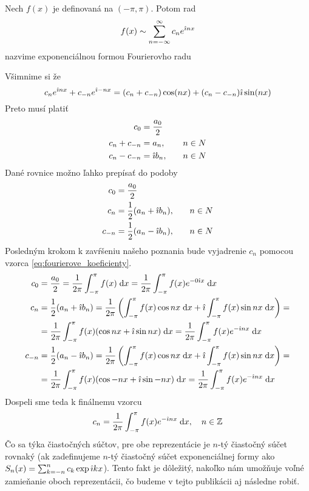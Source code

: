 \begin{definicia}
    Nech $f(x)$ je definovaná na $(-\pi,\pi)$. Potom rad
    \begin{equation}
        f(x) \sim \sum_{n=-\infty}^{\infty} c_n e^{\hat{\imath} n x}
    \end{equation}
    nazvime exponenciálnou formou Fourierovho radu
\end{definicia}
Všimnime si že
\begin{equation}
    c_n e^{\hat{\imath} n x} + c_{-n} e^{\hat{\imath} -n x} =
     (c_n +c_{-n}) \cos(nx) + (c_n - c_{-n}) \hat{\imath} \sin(nx)
\end{equation}
Preto musí platiť
\begin{align}
    c_0 &= \frac{a_0}{2} \\
    c_n + c_{-n} &= a_n, \quad & n \in N \\
    c_n - c_{-n} &= \hat{\imath} b_n, \quad & n \in N
    \label{eq:koeficienty_to_trie}
\end{align}
Dané rovnice možno ľahko prepísať do podoby
\begin{align}
    c_0 &= \frac{a_0}{2} \\
    c_n &= \frac{1}{2}(a_n + \hat{\imath} b_n), \quad & n \in N \\
    c_{-n} &=\frac{1}{2}(a_n - \hat{\imath} b_n), \quad & n \in N
    \label{eq:koeficienty_to_exp}
\end{align}
Posledným krokom k zavŕšeniu našeho poznania bude vyjadrenie $c_n$
pomocou vzorca \ref{eq:fourierove_koeficienty}.
\begin{align}
    c_0 &= \frac{a_0}{2} = \frac{1}{2\pi} \int_{-\pi}^{\pi} f(x) \; \mathrm{d} x = 
            \frac{1}{2\pi} \int_{-\pi}^{\pi} f(x) e^{-0 \hat{\imath} x} \; \mathrm{d} x \\
    c_n &= \frac{1}{2}(a_n + \hat{\imath} b_n) =
          \frac{1}{2\pi}\left(
            \int_{-\pi}^{\pi} f(x) \cos nx \; \mathrm{d} x + 
            \hat{\imath} \int_{-\pi}^{\pi} f(x) \sin nx \; \mathrm{d} x  
            \right) = \\
         &=\frac{1}{2\pi} \int_{-\pi}^{\pi} f(x) (\cos nx + \hat{\imath} \sin nx) \; \mathrm{d} x =
          \frac{1}{2\pi} \int_{-\pi}^{\pi} f(x) e^{- \hat{\imath} n x} \; \mathrm{d} x \\
    c_{-n} &= \frac{1}{2}(a_n - \hat{\imath} b_n) =
          \frac{1}{2\pi}\left(
            \int_{-\pi}^{\pi} f(x) \cos nx \; \mathrm{d} x + 
            \hat{\imath} \int_{-\pi}^{\pi} f(x) \sin nx \; \mathrm{d} x  
            \right) = \\
         &=\frac{1}{2\pi} \int_{-\pi}^{\pi} f(x) (\cos -nx + \hat{\imath} \sin -nx) \; \mathrm{d} x =
          \frac{1}{2\pi} \int_{-\pi}^{\pi} f(x) e^{- \hat{\imath} n x} \; \mathrm{d} x        
\end{align}
Dospeli sme teda k finálnemu vzorcu
\begin{equation}
    c_n = \frac{1}{2\pi} \int_{-\pi}^{\pi} f(x) e^{-\hat{\imath} n x} \; \mathrm{d} x, 
        \quad n\in \mathbb{Z}
\end{equation}
Čo sa týka čiastočných súčtov, pre obe reprezentácie je $n$-tý
čiastočný súčet rovnaký (ak zadefinujeme $n$-tý čiastočný súčet
exponenciálnej formy ako $S_n(x) = \sum_{k=-n}^{n} c_k \exp{\hat{\imath}k
x}$). Tento fakt je dôležitý, nakoľko nám umožňuje voľné zamieňanie
oboch reprezentácii, čo budeme v tejto publikácii aj následne robiť.

